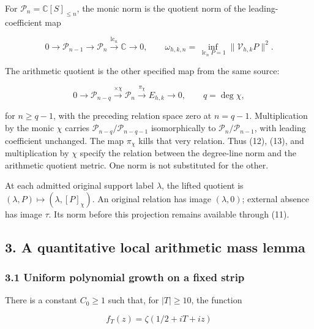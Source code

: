 \documentclass[11pt,a4paper]{article}
\begin{document}
For \(\mathcal P_n=\mathbb C[S]_{\le n}\), the monic norm is the quotient norm of the leading-coefficient map

\[
 0\longrightarrow\mathcal P_{n-1}\longrightarrow\mathcal P_n
 \xrightarrow{\operatorname{lc}_n}\mathbb C\longrightarrow0,
 \qquad
 \omega_{h,k,n}=\inf_{\operatorname{lc}_nP=1}\|\mathcal V_{h,k}P\|^2.
                                                                         \tag{12}
\]

The arithmetic quotient is the other specified map from the same source:

\[
 0\longrightarrow\mathcal P_{n-q}
 \xrightarrow{\times\chi}\mathcal P_n
 \xrightarrow{\pi_\chi}E_{h,k}\longrightarrow0,\qquad q=\deg\chi,
                                                                         \tag{13}
\]

for \(n\ge q-1\), with the preceding relation space zero at \(n=q-1\). Multiplication by the monic \(\chi\) carries \(\mathcal P_{n-q}/\mathcal P_{n-q-1}\) isomorphically to \(\mathcal P_n/\mathcal P_{n-1}\), with leading coefficient unchanged. The map \(\pi_\chi\) kills that very relation. Thus (12), (13), and multiplication by \(\chi\) specify the relation between the degree-line norm and the arithmetic quotient metric. One norm is not substituted for the other.

At each admitted original support label \(\lambda\), the lifted quotient is \((\lambda,P)\mapsto(\lambda,[P]_\chi)\). An original relation has image \((\lambda,0)\); external absence has image \(\tau\). Its norm before this projection remains available through (11).

\subsection{3. A quantitative local arithmetic mass lemma}\label{zlm:endpoint-arithmetic_original--a-quantitative-local-arithmetic-mass-lemma}

\subsubsection{3.1 Uniform polynomial growth on a fixed strip}\label{zlm:endpoint-arithmetic_original--uniform-polynomial-growth-on-a-fixed-strip}

There is a constant \(C_0\ge1\) such that, for \(|T|\ge10\), the function

\[
 f_T(z)=\zeta(1/2+iT+iz)                                                \tag{14}
\]
\end{document}
